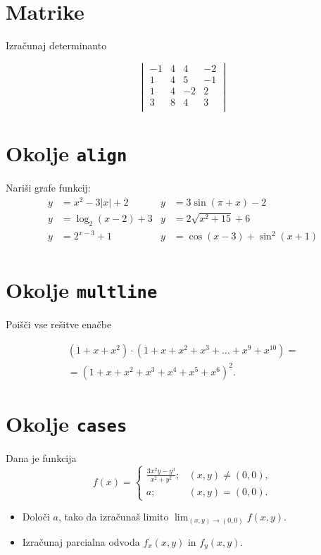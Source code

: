 \documentclass[a4paper,12pt]{article}
\begin{document}
\section*{Matrike}
Izračunaj determinanto


\begin{equation*}
   \begin{vmatrix}
       -1 & 4 & 4 & -2 \\
       1 & 4 & 5 & -1 \\
       1 & 4 & -2 & 2 \\
       3 & 8 & 4 & 3 \\
   \end{vmatrix}
\end{equation*}

\section*{Okolje \texttt{align}}
Nariši grafe funkcij:
\begin{align*}
y &= x^2 - 3|x| + 2  &  y &= 3 \sin(\pi+x) - 2 \\
y &= \log_2(x-2) + 3 &  y &= 2 \sqrt{x^2+15} + 6 \\
y &= 2^{x-3} + 1     &  y &= \cos(x-3) + \sin^2(x+1) \\
\end{align*}

\section*{Okolje \texttt{multline}}
Poišči vse rešitve enačbe

\begin{multline*}
   (1+x+x^2) \cdot (1+x+x^2+x^3+\ldots+x^9+x^{10}) = \\
   =(1+x+x^2+x^3+x^4+x^5+x^6)^2.
\end{multline*}

\section*{Okolje \texttt{cases}}
Dana je funkcija
\[
    f(x) =
    \begin{cases}
       \frac{3x^2y-y^3}{x^2+y^2}; &(x, y) \neq (0, 0), \\
       a; &(x, y) = (0, 0).
    \end{cases}
\]
\begin{itemize}
\item Določi \(a\), tako da izračunaš limito \( \lim_{(x,y)\to(0,0)} f(x,y) \).
\item Izračunaj parcialna odvoda \(f_x(x,y)\) in \(f_y(x,y)\).
\end{itemize}
\end{document}
